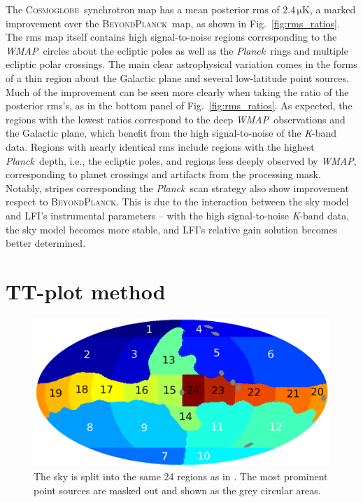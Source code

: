 \documentclass[twocolumn]{../../common/aa}
\def\WMAP{\emph{WMAP}}
\def\Planck{\emph{Planck}}
\newcommand{\bp}{\textsc{BeyondPlanck}}
\newcommand{\cosmoglobe}{\textsc{Cosmoglobe}}
\newcommand{\K}[0]{\textit K}
\begin{document}
The \cosmoglobe\ synchrotron map has a mean posterior rms of $2.4\,\mathrm{\mu K}$, a marked improvement over the \bp\ map, as shown in Fig.~\ref{fig:rms_ratios}. The rms map itself contains high signal-to-noise regions corresponding to the \WMAP\ circles about the ecliptic poles as well as the \Planck\ rings and multiple ecliptic polar crossings. The main clear astrophysical variation comes in the forms of a thin region about the Galactic plane and several low-latitude point sources. Much of the improvement can be seen more clearly when taking the ratio of the posterior rms's, as in the bottom panel of Fig.~\ref{fig:rms_ratios}. As expected, the regions with the lowest ratios correspond to the deep \WMAP\ observations and the Galactic plane, which benefit from the high signal-to-noise of the \K-band data. Regions with nearly identical rms include regions with the highest \Planck\ depth, i.e., the ecliptic poles, and regions less deeply observed by \WMAP, corresponding to planet crossings and artifacts from the processing mask. Notably, stripes corresponding the \Planck\ scan strategy also show improvement respect to \bp. This is due to the interaction between the sky model and LFI's instrumental parameters -- with the high signal-to-noise \K-band data, the sky model becomes more stable, and LFI's relative gain solution becomes better determined.



\section{TT-plot method}
\label{sec:methods}



\begin{figure}
        \centering
        \includegraphics[width=\linewidth]{figures/utnymaske_tall_converted.pdf}
        \caption{The sky is split into the same 24 regions as in \citet{fuskeland2014}. The most prominent point sources are masked out and shown as the grey circular areas.
        }
        \label{fig:regions}
\end{figure}
\end{document}
